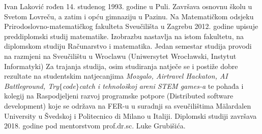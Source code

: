 \documentclass[a4paper,twoside,12pt]{memoir} %
\begin{document}

\begin{cv}
Ivan Laković rođen 14. studenog 1993. godine u Puli. Završava osnovnu školu u Svetom Lovreču, a zatim i opću gimnaziju u Pazinu. Na Matematičkom odsjeku Prirodoslovno-matematičkog fakulteta Sveučilišta u Zagrebu 2012. godine upisuje preddiplomski studij matematike. Izobrazbu nastavlja na istom fakultetu, na diplomskom studiju Računarstvo i matematika. Jedan semestar studija provodi na razmjeni na Sveučilištu u Wroclawu (Uniwersytet Wrocławski, Instytut Informatyki) Za trajanja studija, osim studiranja natječe se i postiže dobre rezultate na studentskim natjecanjima \textit{Mozgalo, Airtravel Hackaton, AI Battleground, Try$\{$code$\}$catch i tehnološkoj areni STEM games-a} te pohađa i kolegij na Raspodjeljeni razvoj programske potpore (Distributed software development) koje se održava na FER-u u suradnji sa sveučilištima Mälardalen University u Švedskoj i Politecnico di Milano u Italiji. Diplomski studiji završava 2018. godine pod mentorstvom prof.dr.sc. Luke Grubišića.
\end{cv}
\end{document}
